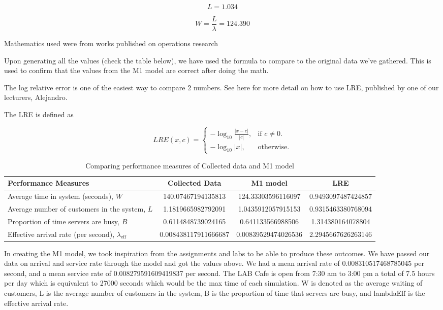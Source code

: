 \documentclass{article}
\begin{document}
$$
L = 1.034
$$

$$
W = \frac{L}{\lambda} = 124.390
$$

Mathematics used were from works published on operations research\cite{hillier1967introduction}\cite{little1961proof}

Upon generating all the values (check the table below), we have used the formula to compare to the original data we’ve gathered. This is used to confirm that the values from the M1 model are correct after doing the math.

The log relative error is one of the easiest way to compare 2 numbers. See here\cite{almiron2010numerical} for more detail on how to use LRE, published by one of our lecturers, Alejandro.

The LRE is defined as 

$$
LRE(x,c)=\begin{cases}
    -\log_{10}{\frac{|x-c|}{|c|}}, & \text{if $c \neq 0$}.\\
    -\log_{10}{|x|}, & \text{otherwise}.
\end{cases}
$$

\begin{table}[H]
    \centering
    \caption{Comparing performance measures of Collected data and M1 model}
    \begin{tabu}{X S S S}
        \toprule
        \textbf{Performance Measures} & \textbf{Collected Data} & \textbf{M1 model}& \textbf{LRE}\\
        \midrule
        Average time in system (seconds), $W$ & 140.07467194135813 & 124.33303596116097 & 0.9493097487424857\\
        Average number of customers in the system, $L$ & 1.1819665982792091 & 1.0435912057915153 & 0.9315463380768094\\
        Proportion of time servers are busy, $B$ & 0.6114848739024165 & 0.641133566988506 & 1.314380164078804\\
        Effective arrival rate (per second), $\lambda_{\text{eff}}$ & 0.008438117911666687 & 0.00839529474026536 & 2.2945667626263146\\
        \bottomrule
    \end{tabu}
    \label{tab:M1}
\end{table}

In creating the M1 model, we took inspiration from the assignments and labs to be able to produce these outcomes. We have passed our data on arrival and service rate through the model and got the values above.
We had a mean arrival rate of 0.008310517468785045 per second, and a mean service rate of 0.008279591609419837 per second. The LAB Cafe is open from 7:30 am to 3:00 pm a total of 7.5 hours per day which is equivalent to 27000 seconds which would be the max time of each simulation. 
W is denoted as the average waiting of customers, L is the average number of customers in the system, B is the proportion of time that servers are busy, and lambdaEff is the effective arrival rate.
\end{document}
